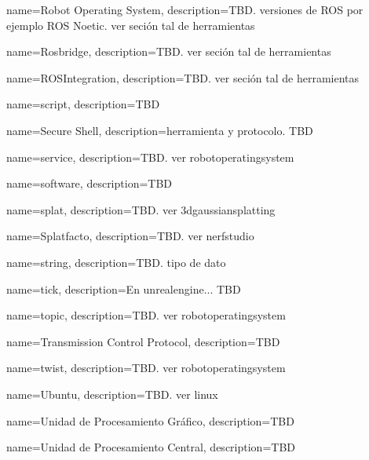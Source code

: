 {
    name={Robot Operating System},
    description={TBD. versiones de ROS por ejemplo ROS Noetic. ver seción tal de herramientas}
}

{
    name={Rosbridge},
    description={TBD. ver seción tal de herramientas}
}

{
    name={ROSIntegration},
    description={TBD. ver seción tal de herramientas}
}


{
    name={script},
    description={TBD}
}

{
    name={Secure Shell},
    description={herramienta y protocolo. TBD}
}

{
    name={service},
    description={TBD. ver \gls{robotoperatingsystem}}
}

{
    name={software},
    description={TBD}
}

{
    name={splat},
    description={TBD. ver \gls{3dgaussiansplatting}}
}

{
    name={Splatfacto},
    description={TBD. ver \gls{nerfstudio}}
}

{
    name={string},
    description={TBD. tipo de dato}
}


{
    name={tick},
    description={En \gls{unrealengine}... TBD}
}

{
    name={topic},
    description={TBD. ver \gls{robotoperatingsystem}}
}

{
    name={Transmission Control Protocol},
    description={TBD}
}

{
    name={twist},
    description={TBD. ver \gls{robotoperatingsystem}}
}


{
    name={Ubuntu},
    description={TBD. ver \gls{linux}}
}

{
    name={Unidad de Procesamiento Gráfico},
    description={TBD}
}

{
    name={Unidad de Procesamiento Central},
    description={TBD}
}

